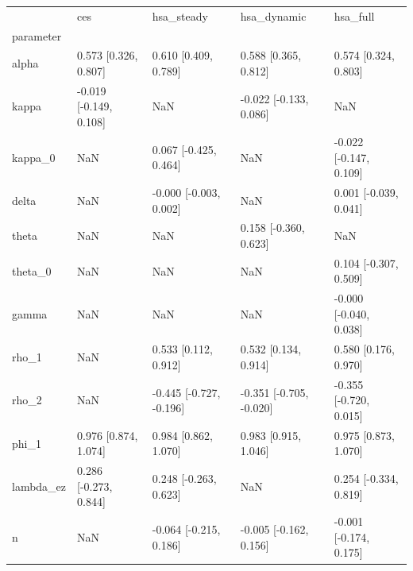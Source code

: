 \begin{tabular}{lllll}
\toprule
 & ces & hsa\_steady & hsa\_dynamic & hsa\_full \\
parameter &  &  &  &  \\
\midrule
alpha & 0.573 [0.326, 0.807] & 0.610 [0.409, 0.789] & 0.588 [0.365, 0.812] & 0.574 [0.324, 0.803] \\
kappa & -0.019 [-0.149, 0.108] & NaN & -0.022 [-0.133, 0.086] & NaN \\
kappa\_0 & NaN & 0.067 [-0.425, 0.464] & NaN & -0.022 [-0.147, 0.109] \\
delta & NaN & -0.000 [-0.003, 0.002] & NaN & 0.001 [-0.039, 0.041] \\
theta & NaN & NaN & 0.158 [-0.360, 0.623] & NaN \\
theta\_0 & NaN & NaN & NaN & 0.104 [-0.307, 0.509] \\
gamma & NaN & NaN & NaN & -0.000 [-0.040, 0.038] \\
rho\_1 & NaN & 0.533 [0.112, 0.912] & 0.532 [0.134, 0.914] & 0.580 [0.176, 0.970] \\
rho\_2 & NaN & -0.445 [-0.727, -0.196] & -0.351 [-0.705, -0.020] & -0.355 [-0.720, 0.015] \\
phi\_1 & 0.976 [0.874, 1.074] & 0.984 [0.862, 1.070] & 0.983 [0.915, 1.046] & 0.975 [0.873, 1.070] \\
lambda\_ez & 0.286 [-0.273, 0.844] & 0.248 [-0.263, 0.623] & NaN & 0.254 [-0.334, 0.819] \\
n & NaN & -0.064 [-0.215, 0.186] & -0.005 [-0.162, 0.156] & -0.001 [-0.174, 0.175] \\
\bottomrule
\end{tabular}
